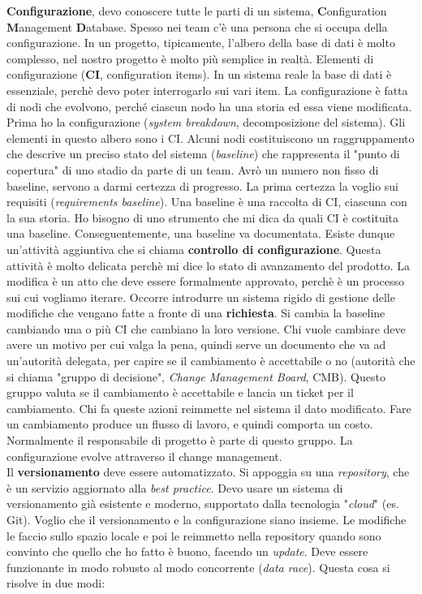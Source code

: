 \textbf{Configurazione}, devo conoscere tutte le parti di un sistema, \textbf{C}onfiguration \textbf{M}anagement \textbf{D}atabase. Spesso nei team c'è una persona che si occupa della configurazione. In un progetto, tipicamente, l'albero della base di dati è molto complesso, nel nostro progetto è molto più semplice in realtà. Elementi di configurazione (\textbf{CI}, configuration items). In un sistema reale la base di dati è essenziale, perchè devo poter interrogarlo sui vari item. La configurazione è fatta di nodi che evolvono, perché ciascun nodo ha una storia ed essa viene modificata. Prima ho la configurazione (\textit{system breakdown}, decomposizione del sistema). Gli elementi in questo albero sono i CI. Alcuni nodi costituiscono un raggruppamento che descrive un preciso stato del sistema (\textit{baseline}) che rappresenta il "punto di copertura" di uno stadio da parte di un team. Avrò un numero non fisso di baseline, servono a darmi certezza di progresso. La prima certezza la voglio sui requisiti (\textit{requirements baseline}). Una baseline è una raccolta di CI, ciascuna con la sua storia. Ho bisogno di uno strumento che mi dica da quali CI è costituita una baseline. Conseguentemente, una baseline va documentata. Esiste dunque un'attività aggiuntiva che si chiama \textbf{controllo di configurazione}. Questa attività è molto delicata perchè mi dice lo stato di avanzamento del prodotto. La modifica è un atto che deve essere formalmente approvato, perchè è un processo sui cui vogliamo iterare. Occorre introdurre un sistema rigido di gestione delle modifiche che vengano fatte a fronte di una \textbf{richiesta}. Si cambia la baseline cambiando una o più CI che cambiano la loro versione. Chi vuole cambiare deve avere un motivo per cui valga la pena, quindi serve un documento che va ad un'autorità delegata, per capire se il cambiamento è accettabile o no (autorità che si chiama "gruppo di decisione", \textit{Change Management Board}, CMB). Questo gruppo valuta se il cambiamento è accettabile e lancia un ticket per il cambiamento. Chi fa queste azioni reimmette nel sistema il dato modificato. Fare un cambiamento produce un flusso di lavoro, e quindi comporta un costo. Normalmente il responsabile di progetto è parte di questo gruppo. La configurazione evolve attraverso il change management.\\

Il \textbf{versionamento} deve essere automatizzato. Si appoggia su una \textit{repository}, che è un servizio aggiornato alla \textit{best practice}. Devo usare un sistema di versionamento già esistente e moderno, supportato dalla tecnologia "\textit{cloud}" (es. Git). Voglio che il versionamento e la configurazione siano insieme. Le modifiche le faccio sullo spazio locale e poi le reimmetto nella repository quando sono convinto che quello che ho fatto è buono, facendo un \textit{update}. Deve essere funzionante in modo robusto al modo concorrente (\textit{data race}). Questa cosa si risolve in due modi:

